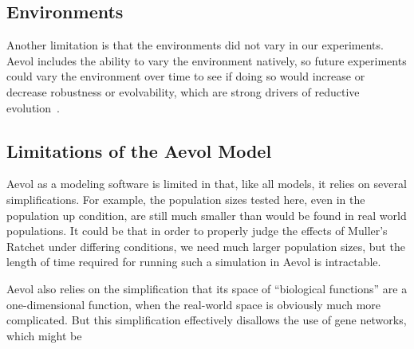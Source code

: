 \subsection{Environments}
Another limitation is that the environments did not vary in our experiments. Aevol includes the ability to vary the environment natively, so future experiments could vary the environment over time to see if doing so would increase or decrease robustness or evolvability, which are strong drivers of reductive evolution~\cite{Batut.2013}. 

\subsection{Limitations of the Aevol Model}
Aevol as a modeling software is limited in that, like all models, it relies on several simplifications. For example, the population sizes tested here, even in the population up condition, are still much smaller than would be found in real world populations. It could be that in order to properly judge the effects of Muller's Ratchet under differing conditions, we need much larger population sizes, but the length of time required for running such a simulation in Aevol is intractable.

Aevol also relies on the simplification that its space of ``biological functions'' are a one-dimensional function, when the real-world space is obviously much more complicated. But this simplification effectively disallows the use of gene networks, which might be 

